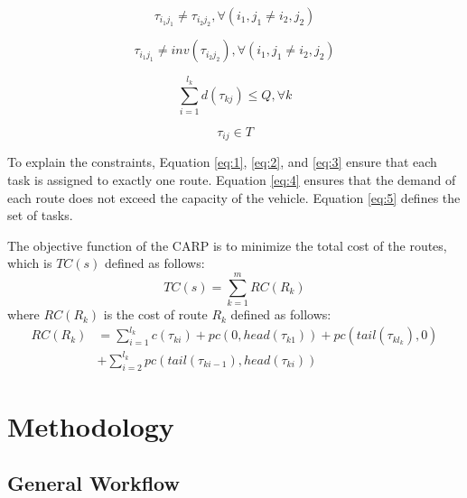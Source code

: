 \documentclass[conference]{IEEEtran}
\begin{document}
\begin{equation}
    \label{eq:2}
    \tau_{i_1 j_1} \neq \tau_{i_2 j_2}, \forall (i_1, j_1 \neq i_2, j_2)
\end{equation}

\begin{equation}
    \label{eq:3}
    \tau_{i_1 j_1} \neq inv(\tau_{i_2 j_2}), \forall (i_1, j_1 \neq i_2, j_2)
\end{equation}

\begin{equation}
    \label{eq:4}
    \sum_{i=1}^{l_k} d(\tau_{k j}) \leq Q, \forall k
\end{equation}

\begin{equation}
    \label{eq:5}
    \tau_{i j} \in T
\end{equation}

To explain the constraints, Equation \ref{eq:1}, \ref{eq:2}, and \ref{eq:3} ensure that each task is assigned to exactly one route.
Equation \ref{eq:4} ensures that the demand of each route does not exceed the capacity of the vehicle.
Equation \ref{eq:5} defines the set of tasks.

The objective function of the CARP is to minimize the total cost of the routes, which is $TC(s)$ defined as follows:
\begin{equation}
    \label{eq:6}
    TC(s) = \sum_{k=1}^{m} RC(R_k)
\end{equation}
where $RC(R_k)$ is the cost of route $R_k$ defined as follows:
\begin{equation}
    \label{eq:7}
    \begin{split}
        RC(R_k) &= \sum_{i=1}^{l_k} c(\tau_{k i}) + pc(0, head(\tau_{k 1})) + pc(tail(\tau_{k l_k}), 0)\\
                &+ \sum_{i=2}^{l_k} pc(tail(\tau_{k i-1}), head(\tau_{k i}))
    \end{split}
\end{equation}

\section{Methodology}
\label{sec:methodology}

\subsection{General Workflow}
\end{document}

